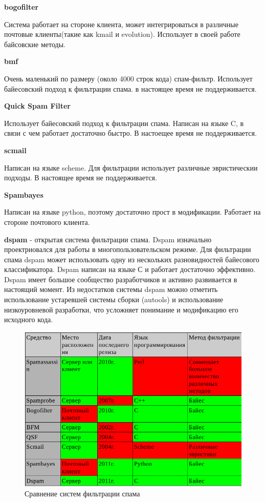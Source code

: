 \textbf{bogofilter}

Система работает на стороне клиента, может интегрироваться в различные почтовые клиенты(такие как kmail и evolution). Использует в своей работе байсовские методы.

\textbf{bmf}

Очень маленький по размеру (около 4000 строк кода) спам-фильтр. Использует байесовский подход к фильтрации спама. в настоящее время не поддерживается.

\textbf{Quick Spam Filter}

Использует байесовский подход к фильтрации спама. Написан на языке C, в связи с чем работает достаточно быстро. В настоещее время не поддерживается.

\textbf{scmail}

Написан на языке scheme. Для фильтрации использует различные эвристическии подходы. В настоящее время не поддерживается.

\textbf{Spambayes}

Написан на языке python, поэтому достаточно прост в модификации. Работает на стороне почтового клиента.

\textbf{dspam} - открытая система фильтрации спама. Dspam изначально проектриовался для работы в многопользовательском режиме.
Для фильтрации спама dspam может использовать одну из нескольких разновидностей байесового классификатора.
Dspam написан на языке С и работает достаточно эффективно. Dspam имеет большое сообщество разработчиков и активно развивается в настоящий момент.
Из недостатков системы dspam можно отметить использование устаревшей системы сборки (autools) и использование низкоуровневой разработки, что усложняет понимание и модификацию его исходного кода.
\begin{figure}[h]
\begin{center}
\includegraphics[width=13cm]{img/compare}
\end{center}
\caption{Сравнение систем фильтрации спама}
\label{spam_systems}
\end{figure}



